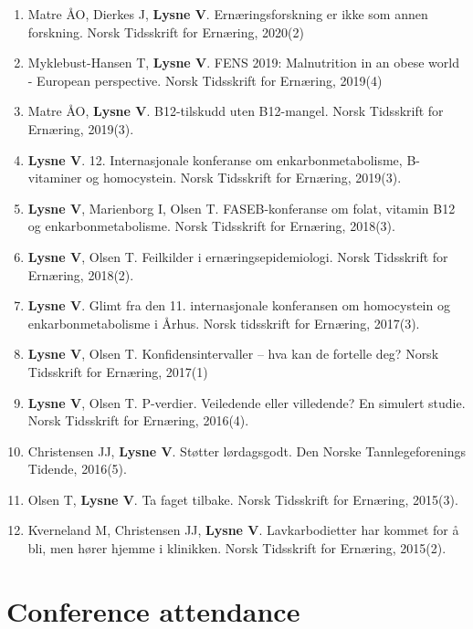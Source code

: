 \documentclass[11pt, a4paper]{awesome-cv}
\providecommand{\tightlist}{%
	\setlength{\itemsep}{0pt}\setlength{\parskip}{0pt}}
\begin{document}
\begin{enumerate}
\def\labelenumi{\arabic{enumi}.}
\tightlist
\item
  Matre ÅO, Dierkes J, \textbf{Lysne V}. Ernæringsforskning er ikke som
  annen forskning. Norsk Tidsskrift for Ernæring, 2020(2)
\item
  Myklebust-Hansen T, \textbf{Lysne V}. FENS 2019: Malnutrition in an
  obese world - European perspective. Norsk Tidsskrift for Ernæring,
  2019(4)
\item
  Matre ÅO, \textbf{Lysne V}. B12-tilskudd uten B12-mangel. Norsk
  Tidsskrift for Ernæring, 2019(3).
\item
  \textbf{Lysne V}. 12. Internasjonale konferanse om
  enkarbonmetabolisme, B-vitaminer og homocystein. Norsk Tidsskrift for
  Ernæring, 2019(3).
\item
  \textbf{Lysne V}, Marienborg I, Olsen T. FASEB-konferanse om folat,
  vitamin B12 og enkarbonmetabolisme. Norsk Tidsskrift for Ernæring,
  2018(3).
\item
  \textbf{Lysne V}, Olsen T. Feilkilder i ernæringsepidemiologi. Norsk
  Tidsskrift for Ernæring, 2018(2).
\item
  \textbf{Lysne V}. Glimt fra den 11. internasjonale konferansen om
  homocystein og enkarbonmetabolisme i Århus. Norsk tidsskrift for
  Ernæring, 2017(3).
\item
  \textbf{Lysne V}, Olsen T. Konfidensintervaller -- hva kan de fortelle
  deg? Norsk Tidsskrift for Ernæring, 2017(1)
\item
  \textbf{Lysne V}, Olsen T. P-verdier. Veiledende eller villedende? En
  simulert studie. Norsk Tidsskrift for Ernæring, 2016(4).
\item
  Christensen JJ, \textbf{Lysne V}. Støtter lørdagsgodt. Den Norske
  Tannlegeforenings Tidende, 2016(5).
\item
  Olsen T, \textbf{Lysne V}. Ta faget tilbake. Norsk Tidsskrift for
  Ernæring, 2015(3).
\item
  Kverneland M, Christensen JJ, \textbf{Lysne V}. Lavkarbodietter har
  kommet for å bli, men hører hjemme i klinikken. Norsk Tidsskrift for
  Ernæring, 2015(2).
\end{enumerate}

\newpage

\hypertarget{conference-attendance}{%
\section{Conference attendance}\label{conference-attendance}}
\end{document}
